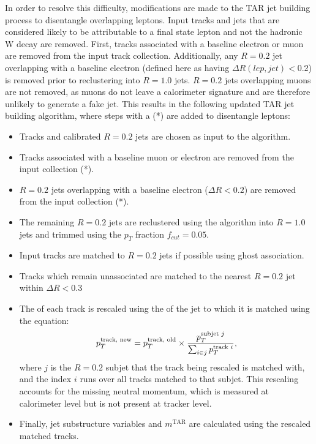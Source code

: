 In order to resolve this difficulty, modifications are made to the TAR jet building process to disentangle overlapping leptons. Input tracks and jets that are considered likely to be attributable to a final state lepton and not the hadronic W decay are removed. First, tracks associated with a baseline electron or muon are removed from the input track collection. Additionally, any \akt $R=0.2$ jet overlapping with a baseline electron (defined here as having $\Delta R(lep,jet) < 0.2$) is removed prior to reclustering into $R=1.0$ jets. $R=0.2$ jets overlapping muons are not removed, as muons do not leave a calorimeter signature and are therefore unlikely to generate a fake jet. This results in the following updated TAR jet building algorithm, where steps with a (*) are added to disentangle leptons:

\begin{itemize}
  \item Tracks and calibrated \akt $R=0.2$ jets are chosen as input to the algorithm.
  \item Tracks associated with a baseline muon or electron are removed from the input collection (*).
  \item \akt $R=0.2$ jets overlapping with a baseline electron ($\Delta R<0.2$) are removed from the input collection (*).
  \item The remaining \akt $R=0.2$ jets are reclustered using the \akt algorithm into $R=1.0$ jets and trimmed using the $p_T$ fraction \(f_{cut}=0.05\).
  \item Input tracks are matched to $R=0.2$ jets if possible using ghost association.
  \item Tracks which remain unassociated are matched to the nearest \akt $R=0.2$ jet within $\Delta R<0.3$
  \item The \pT of each track is rescaled using the \pT of the jet to which it is matched using the equation:
  \begin{equation}
  p_T^{\text{track, new}} = p_T^{\text{track, old}}\times \frac{p_T^{\text{subjet $j$}}}{\sum_{i \in j} p_T^{\text{track $i$}}} ,
  \label{eq:TAR_rescale}
  \end{equation}  where $j$ is the $R=0.2$ subjet that the track being rescaled is matched with, and the index $i$ runs over all tracks matched to that subjet. This rescaling accounts for the missing neutral momentum, which is measured at calorimeter level but is not present at tracker level.
  \item Finally, jet substructure variables and  $m^\text{TAR}$ are calculated using the rescaled matched tracks.
\end{itemize}

